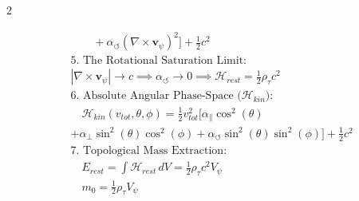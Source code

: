 \documentclass[11pt, a4paper]{article}
\begin{document}
\begin{multicols}{2}
\begin{tcolorbox}
\begin{align}
    &\quad \quad + \alpha_{\circlearrowleft}(\nabla \times \mathbf{v}_{\psi})^2 \Big] + \frac{1}{2} c^2 \label{eq:kinematic_hamiltonian} \\
    &\text{5. The Rotational Saturation Limit:} \nonumber \\
    &|\nabla \times \mathbf{v}_{\psi}| \to c \implies \alpha_{\circlearrowleft} \to 0 \implies \mathcal{H}_{rest} = \frac{1}{2}\rho_{\tau}c^2 \label{eq:hamiltonian_rest_mass} \\
    &\text{6. Absolute Angular Phase-Space ($\mathcal{H}_{kin}$):} \nonumber \\
    &\quad \mathcal{H}_{kin}(v_{tot}, \theta, \phi) = \frac{1}{2} v_{tot}^2 \Big[ \alpha_{\parallel} \cos^2(\theta) \nonumber \\
    &+ \alpha_{\perp} \sin^2(\theta)\cos^2(\phi)  + \alpha_{\circlearrowleft} \sin^2(\theta)\sin^2(\phi) \Big] + \frac{1}{2} c^2 \label{eq:angular_hamiltonian} \\
    &\text{7. Topological Mass Extraction:} \nonumber \\
    &\quad E_{rest} = \int \mathcal{H}_{rest} \, dV = \frac{1}{2} \rho_{\tau} c^2 V_{\psi} \label{eq:rest_energy_integral} \\
    &\quad m_0 = \frac{1}{2} \rho_{\tau} V_{\psi} \label{eq:topological_mass}
\end{align}
\end{tcolorbox}


\end{multicols}
\end{document}
